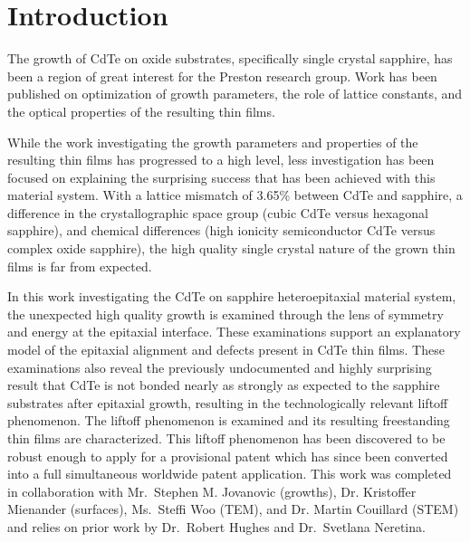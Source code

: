\section{Introduction}
The growth of CdTe on oxide substrates, specifically single crystal sapphire, has been a region of great interest for the Preston research group.
Work has been published on optimization of growth parameters, the role of lattice constants, and the optical properties of the resulting thin films\cite{Neretina2009a,Neretina2008b,Neretina2009b,Neretina2007,Neretina2006,cdte-optical}.

While the work investigating the growth parameters and properties of the resulting thin films has progressed to a high level, less investigation has been focused on explaining the surprising success that has been achieved with this material system.
With a lattice mismatch of 3.65\% between CdTe and sapphire, a difference in the 
crystallographic space group (cubic CdTe versus hexagonal sapphire), and chemical differences (high ionicity semiconductor CdTe versus complex oxide sapphire), the high quality single crystal nature of the grown thin films is far from expected.

In this work investigating the CdTe on sapphire heteroepitaxial material system, the unexpected high quality growth is examined through the lens of symmetry and energy at the epitaxial interface.
These examinations support an explanatory model of the epitaxial alignment and defects present in CdTe thin films.
These examinations also reveal the previously undocumented and highly surprising result that CdTe is not bonded nearly as strongly as expected to the sapphire substrates after epitaxial growth, resulting in the technologically relevant liftoff phenomenon.
The liftoff phenomenon is examined and its resulting freestanding thin films are characterized.
This liftoff phenomenon has been discovered to be robust enough to apply for a provisional patent\cite{patent} which has since been converted into a full simultaneous worldwide patent application.
This work was completed in collaboration with Mr.~Stephen M. Jovanovic (growths), Dr.
Kristoffer Mienander (surfaces), Ms.~Steffi Woo (TEM), and Dr. Martin Couillard (STEM) and relies on prior work by Dr.~Robert Hughes and Dr.~Svetlana Neretina.
